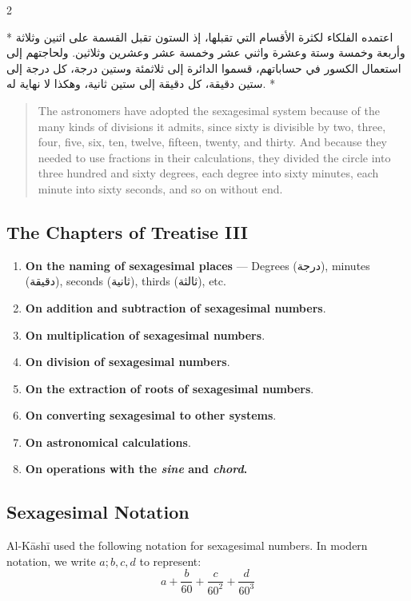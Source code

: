 \documentclass[11pt,a4paper]{article}
\newcommand{\ar}[1]{{\arabicfont\beginR #1\endR}}
\newenvironment{bilingual}{%
  \vspace{0.3em}%
  \begin{paracol}{2}%
}{%
  \end{paracol}%
  \vspace{0.3em}%
}
\begin{document}
\begin{bilingual}
\switchcolumn[0]*
\ar{اعتمده الفلكاء لكثرة الأقسام التي تقبلها، إذ الستون تقبل القسمة على اثنين وثلاثة وأربعة وخمسة وستة وعشرة واثني عشر وخمسة عشر وعشرين وثلاثين. ولحاجتهم إلى استعمال الكسور في حساباتهم، قسموا الدائرة إلى ثلاثمئة وستين درجة، كل درجة إلى ستين دقيقة، كل دقيقة إلى ستين ثانية، وهكذا لا نهاية له.}
\switchcolumn[1]*
\begin{quote}
The astronomers have adopted the sexagesimal system because of the many
kinds of divisions it admits, since sixty is divisible by two, three,
four, five, six, ten, twelve, fifteen, twenty, and thirty. And because
they needed to use fractions in their calculations, they divided the
circle into three hundred and sixty degrees, each degree into sixty
minutes, each minute into sixty seconds, and so on without end.
\end{quote}
\end{bilingual}

\subsection{The Chapters of Treatise III}

\begin{enumerate}[label=\textbf{Ch.\arabic*:}]
  \item \textbf{On the naming of sexagesimal places} --- Degrees
  (\ar{درجة}), minutes (\ar{دقيقة}), seconds (\ar{ثانية}), thirds
  (\ar{ثالثة}), etc.
  \item \textbf{On addition and subtraction of sexagesimal numbers}.
  \item \textbf{On multiplication of sexagesimal numbers}.
  \item \textbf{On division of sexagesimal numbers}.
  \item \textbf{On the extraction of roots of sexagesimal numbers}.
  \item \textbf{On converting sexagesimal to other systems}.
  \item \textbf{On astronomical calculations}.
  \item \textbf{On operations with the \textit{sine} and
  \textit{chord}.}
\end{enumerate}

\subsection{Sexagesimal Notation}

Al-K\=ash\=i used the following notation for sexagesimal numbers. In modern
notation, we write $a; b, c, d$ to represent:
\[
a + \frac{b}{60} + \frac{c}{60^2} + \frac{d}{60^3}
\]
\end{document}
